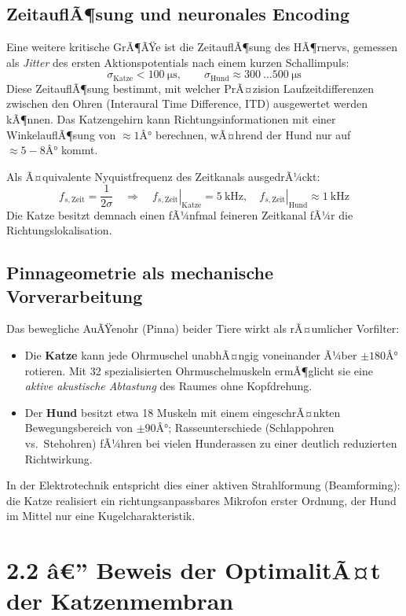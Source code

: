 ﻿\documentclass[12pt,a4paper,titlepage]{report}
\begin{document}
\subsection{ZeitauflÃ¶sung und neuronales Encoding}

Eine weitere kritische GrÃ¶ÃŸe ist die ZeitauflÃ¶sung des HÃ¶rnervs,
gemessen als \emph{Jitter} des ersten Aktionspotentials nach einem
kurzen Schallimpuls:
\[
\sigma_{\text{Katze}} < \SI{100}{\micro\second},
\qquad
\sigma_{\text{Hund}} \approx \SI{300}{\ldots}\SI{500}{\micro\second}
\]
Diese ZeitauflÃ¶sung bestimmt, mit welcher PrÃ¤zision Laufzeitdifferenzen
zwischen den Ohren (Interaural Time Difference, ITD) ausgewertet werden kÃ¶nnen.
Das Katzengehirn kann Richtungsinformationen mit einer WinkelauflÃ¶sung von
$\approx 1Â°$ berechnen, wÃ¤hrend der Hund nur auf $\approx 5{-}8Â°$ kommt.

Als Ã¤quivalente Nyquistfrequenz des Zeitkanals ausgedrÃ¼ckt:
\[
f_{s,\text{Zeit}} = \frac{1}{2\sigma}
\quad\Rightarrow\quad
\left.f_{s,\text{Zeit}}\right|_{\text{Katze}} = \SI{5}{\kilo\hertz},
\quad
\left.f_{s,\text{Zeit}}\right|_{\text{Hund}} \approx \SI{1}{\kilo\hertz}
\]
Die Katze besitzt demnach einen fÃ¼nfmal feineren Zeitkanal fÃ¼r die Richtungslokalisation.

\subsection{Pinnageometrie als mechanische Vorverarbeitung}

Das bewegliche AuÃŸenohr (Pinna) beider Tiere wirkt als rÃ¤umlicher Vorfilter:
\begin{itemize}[leftmargin=2em]
\item Die \textbf{Katze} kann jede Ohrmuschel unabhÃ¤ngig voneinander Ã¼ber
$\pm 180Â°$ rotieren. Mit 32 spezialisierten Ohrmuschelmuskeln ermÃ¶glicht
sie eine \emph{aktive akustische Abtastung} des Raumes ohne Kopfdrehung.
\item Der \textbf{Hund} besitzt etwa 18 Muskeln mit einem eingeschrÃ¤nkten
Bewegungsbereich von $\pm 90Â°$; Rasseunterschiede (Schlappohren vs.~Stehohren)
fÃ¼hren bei vielen Hunderassen zu einer deutlich reduzierten Richtwirkung.
\end{itemize}
In der Elektrotechnik entspricht dies einer aktiven Strahlformung (Beamforming):
die Katze realisiert ein richtungsanpassbares Mikrofon erster Ordnung,
der Hund im Mittel nur eine Kugelcharakteristik.

\section{2.2 â€” Beweis der OptimalitÃ¤t der Katzenmembran}
\label{sec:aktiv}
\end{document}
